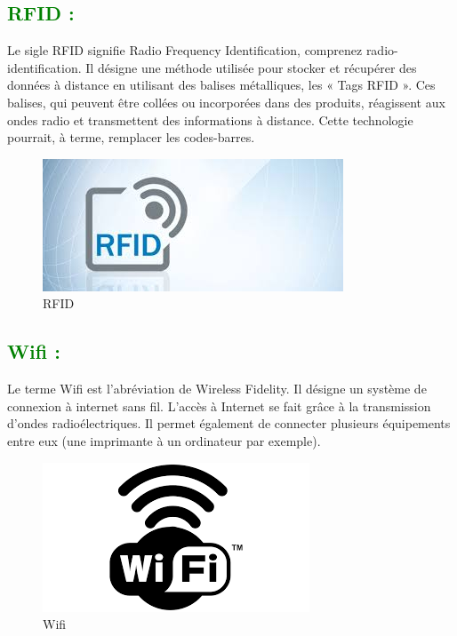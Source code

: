 \begin{flushleft}
	\subsection{\textcolor{green}{RFID :}}
	Le sigle RFID signifie Radio Frequency Identification, comprenez radio-
	identification. Il désigne une méthode utilisée pour stocker et récupérer
	des données à distance en utilisant des balises métalliques, les « Tags
	RFID ». Ces balises, qui peuvent être collées ou incorporées dans des
	produits, réagissent aux ondes radio et transmettent des informations à
	distance. Cette technologie pourrait, à terme, remplacer les codes-barres.
	\begin{figure}[h]
		\centering
		\includegraphics{chapitres/images/RFID.jpg}
		\caption{RFID}
		\label{fig:labelname}
	\end{figure}

	\subsection{\textcolor{green}{Wifi :}}
	Le terme Wifi est l’abréviation de Wireless Fidelity. Il désigne un
	système de connexion à internet sans fil. L’accès à Internet se fait grâce
	à la transmission d’ondes radioélectriques. Il permet également de
	connecter plusieurs équipements entre eux (une imprimante à un ordinateur par exemple).
	\begin{figure}[h]
		\centering
		\includegraphics{chapitres/images/Wifi.png}
		\caption{Wifi}
		\label{fig:labelname}
	\end{figure}


\end{flushleft}
